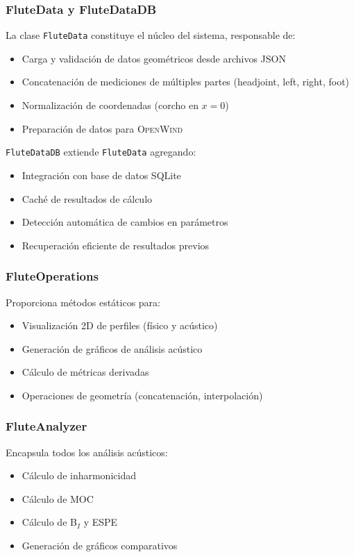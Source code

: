 \documentclass[12pt,a4paper,twocolumn]{article}
\newcommand{\openwind}{\textsc{OpenWind}}
\begin{document}
\subsubsection{FluteData y FluteDataDB}

La clase \texttt{FluteData} constituye el núcleo del sistema, responsable de:
\begin{itemize}
    \item Carga y validación de datos geométricos desde archivos JSON
    \item Concatenación de mediciones de múltiples partes (headjoint, left, right, foot)
    \item Normalización de coordenadas (corcho en $x=0$)
    \item Preparación de datos para \openwind{}
\end{itemize}

\texttt{FluteDataDB} extiende \texttt{FluteData} agregando:
\begin{itemize}
    \item Integración con base de datos SQLite
    \item Caché de resultados de cálculo
    \item Detección automática de cambios en parámetros
    \item Recuperación eficiente de resultados previos
\end{itemize}

\subsubsection{FluteOperations}

Proporciona métodos estáticos para:
\begin{itemize}
    \item Visualización 2D de perfiles (físico y acústico)
    \item Generación de gráficos de análisis acústico
    \item Cálculo de métricas derivadas
    \item Operaciones de geometría (concatenación, interpolación)
\end{itemize}

\subsubsection{FluteAnalyzer}

Encapsula todos los análisis acústicos:
\begin{itemize}
    \item Cálculo de inharmonicidad
    \item Cálculo de MOC
    \item Cálculo de B$_I$ y ESPE
    \item Generación de gráficos comparativos
\end{itemize}
\end{document}
